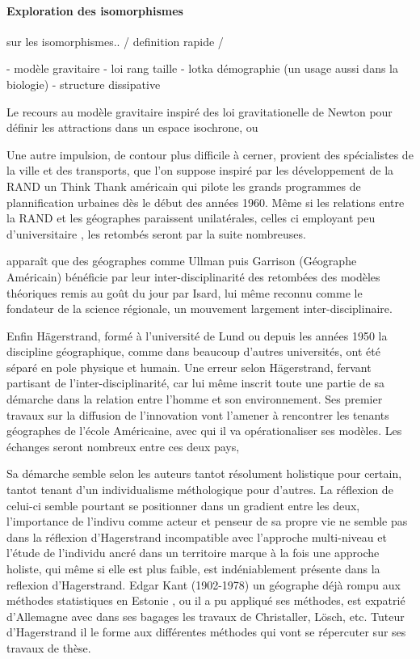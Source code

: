 {\paragraph{Exploration des isomorphismes}

\autocite[699]{Pouvreau2013} sur les isomorphismes.. / definition rapide /

- modèle gravitaire 
- loi rang taille
- lotka démographie (un usage aussi dans la biologie)
- structure dissipative

Le recours au modèle gravitaire inspiré des loi gravitationelle de Newton pour définir les attractions dans un espace isochrone, ou  

Une autre impulsion, de contour plus difficile à cerner, provient des spécialistes de la ville et des transports, que l'on suppose inspiré par les développement de la RAND un Think Thank américain qui pilote les grands programmes de plannification urbaines dès le début des années 1960. Même si les relations entre la RAND et les géographes paraissent unilatérales, celles ci employant peu d'universitaire \autocite[9]{Batty1994}, les retombés seront par la suite nombreuses. 

 apparaît que des géographes comme Ullman puis Garrison (Géographe Américain) bénéficie par leur inter-disciplinarité des retombées des modèles théoriques remis au goût du jour par Isard, lui même reconnu comme le fondateur de la science régionale, un mouvement largement inter-disciplinaire.

Enfin Hägerstrand, formé à l'université de Lund ou depuis les années 1950 la discipline géographique, comme dans beaucoup d'autres universités, ont été séparé en pole physique et humain. Une erreur selon Hägerstrand, fervant partisant de l'inter-disciplinarité, car lui même inscrit toute une partie de sa démarche dans la relation entre l'homme et son environnement. Ses premier travaux sur la diffusion de l'innovation vont l'amener à rencontrer les tenants géographes de l'école Américaine, avec qui il va opérationaliser ses modèles. Les échanges seront nombreux entre ces deux pays,  \autocite{Chardonnel1999}

Sa démarche semble selon les auteurs tantot résolument holistique pour certain, tantot tenant d'un individualisme méthologique pour d'autres. La réflexion de celui-ci semble pourtant se positionner dans un gradient entre les deux, l'importance de l'indivu comme acteur et penseur de sa propre vie ne semble pas dans la réflexion d'Hagerstrand incompatible avec l'approche multi-niveau et l'étude de l'individu ancré dans un territoire marque à la fois une approche holiste, qui même si elle est plus faible, est indéniablement présente dans la reflexion d'Hagerstrand. Edgar Kant (1902-1978) un géographe déjà rompu aux méthodes statistiques en Estonie \autocite{Chabot1937} , ou il a pu appliqué ses méthodes, est expatrié d'Allemagne avec dans ses bagages les travaux de Christaller, Lösch, etc. Tuteur d'Hagerstrand il le forme aux différentes méthodes qui vont se répercuter sur ses travaux de thèse.

}
